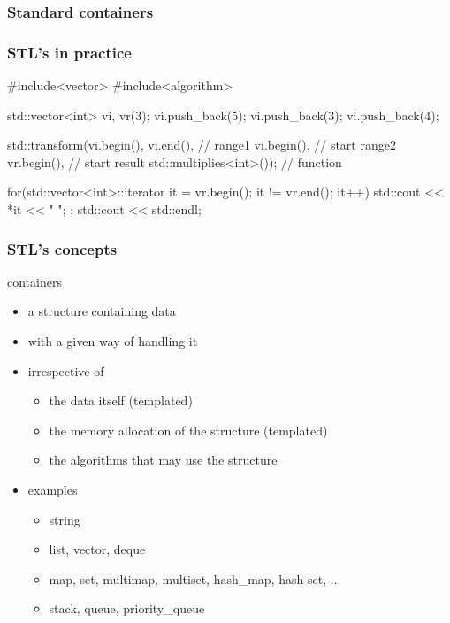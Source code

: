 \subsubsection[Containers]{Standard containers}

\begin{frame}[fragile,label=STLcode]
  \frametitle{STL's in practice}
  \begin{cppcode*}{}
    #include<vector>
    #include<algorithm>

    std::vector<int> vi, vr(3);
    vi.push_back(5); vi.push_back(3); vi.push_back(4);

    std::transform(vi.begin(), vi.end(),      // range1
                   vi.begin(),          // start range2
                   vr.begin(),          // start result
                   std::multiplies<int>()); // function

    for(std::vector<int>::iterator it = vr.begin();
        it != vr.end();
        it++) {
      std::cout << *it << " ";
    };
    std::cout << std::endl;
  \end{cppcode*}
\end{frame}

\begin{frame}[fragile]
  \frametitle{STL's concepts}
  \begin{block}{containers}
    \begin{itemize}
    \item a structure containing data
    \item with a given way of handling it
    \item irrespective of
      \begin{itemize}
      \item the data itself (templated)
      \item the memory allocation of the structure (templated)
      \item the algorithms that may use the structure
      \end{itemize}
    \item examples
      \begin{itemize}
      \item string
      \item list, vector, deque
      \item map, set, multimap, multiset, hash\_map, hash-set, ...
      \item stack, queue, priority\_queue
      \end{itemize}
    \end{itemize}
  \end{block}
\end{frame}

